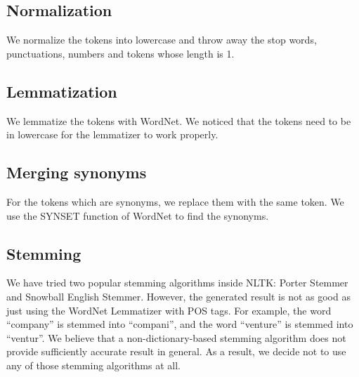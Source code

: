 \documentclass{article}
\begin{document}
\subsection{Normalization}
We normalize the tokens into lowercase and throw away the stop words,
punctuations, numbers and tokens whose length is 1.

\subsection{Lemmatization}
We lemmatize the tokens with WordNet. We noticed that the tokens need to be
in lowercase for the lemmatizer to work properly.

\subsection{Merging synonyms}
For the tokens which are synonyms, we replace them with the same token. We use
the SYNSET function of WordNet to find the synonyms.

\subsection{Stemming}
We have tried two popular stemming algorithms inside NLTK: Porter Stemmer and
Snowball English Stemmer. However, the generated result is not as good as just
using the WordNet Lemmatizer with POS tags. For example, the word ``company'' is
stemmed into ``compani'', and the word ``venture'' is stemmed into ``ventur''. We
believe that a non-dictionary-based stemming algorithm does not provide
sufficiently accurate result in general. As a result, we decide not to use any
of those stemming algorithms at all.
\end{document}

